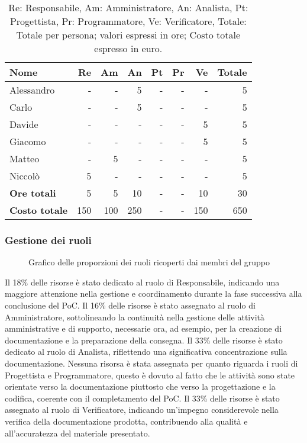 \begin{table}[H]
	\centering
	\begin{tabular}{l|r|r|r|r|r|r|r}
	\textbf{Nome} & \textbf{Re} & \textbf{Am} & \textbf{An} & \textbf{Pt} & \textbf{Pr} & \textbf{Ve} & \textbf{Totale} \\
	\hline
	Alessandro & - & - & 5 & - & - & - & 5 \\
	Carlo & - & - & 5 & - & - & - & 5 \\
	Davide & - & - & - & - & - & 5 & 5 \\
	Giacomo & - & - & - & - & - & 5 & 5 \\
	Matteo & - & 5 & - & - & - & - & 5 \\
	Niccolò & 5 & - & - & - & - & - & 5 \\
	\hline
	\textbf{Ore totali} & 5 & 5 & 10 & - & - & 10 & 30 \\
	\textbf{Costo totale} & 150 & 100 & 250 & - & - & 150 & 650
	\end{tabular}
	\caption{Re: Responsabile, Am: Amministratore, An: Analista, Pt: Progettista,
		Pr: Programmatore, Ve: Verificatore, Totale: Totale per persona; valori espressi in ore; Costo totale espresso in euro.} 
\end{table}

\newpage
\subsubsection{Gestione dei ruoli}

\begin{figure}[h]
	\centering
    \caption{Grafico delle proporzioni dei ruoli ricoperti dai membri del gruppo}
\end{figure}

Il 18\% delle risorse è stato dedicato al ruolo di Responsabile, indicando una maggiore attenzione nella gestione e coordinamento 
durante la fase successiva alla conclusione del PoC.
Il 16\% delle risorse è stato assegnato al ruolo di Amministratore, sottolineando la continuità nella gestione delle attività amministrative e di supporto, necessarie ora, ad esempio, per la creazione di documentazione e la preparazione della consegna.
Il 33\% delle risorse è stato dedicato al ruolo di Analista, riflettendo una significativa concentrazione sulla documentazione.
Nessuna risorsa è stata assegnata per quanto riguarda i ruoli di Progettista e Programmatore, questo è dovuto al fatto che le attività sono state orientate verso la documentazione piuttosto che verso la progettazione e la codifica, coerente con il completamento del PoC.
Il 33\% delle risorse è stato assegnato al ruolo di Verificatore, indicando un'impegno considerevole nella verifica della documentazione prodotta, contribuendo alla qualità e all'accuratezza del materiale presentato.

